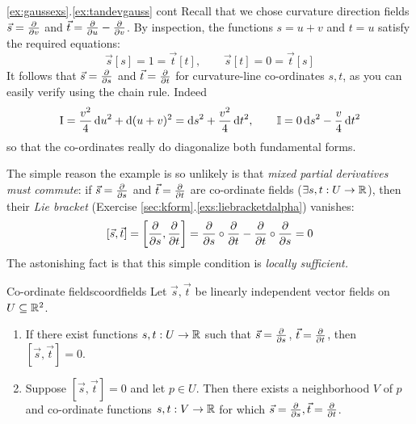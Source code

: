 \begin{example*}{\ref*{ex:gaussexs}.\ref{ex:tandevgauss} cont}{}
	Recall that we chose curvature direction fields $\vec s=\frac{\partial }{\partial v}$ and $\vec t=\frac{\partial }{\partial u}-\frac{\partial }{\partial v}$. By inspection, the functions $s=u+v$ and $t=u$ satisfy the required equations:
	\[
		\vec s[s]=1=\vec t[t],\qquad \vec s[t]=0=\vec t[s] \tag{$\ast$}
	\]
	It follows that $\vec s=\frac{\partial }{\partial s}$ and $\vec t=\frac{\partial }{\partial t}$ for curvature-line co-ordinates $s,t$, as you can easily verify using the chain rule. Indeed
	\[
		\mathrm{I}=\frac{v^2}4\,{\mathrm{d} u}^2+\mathrm{d}(u+v)^2 ={\mathrm{d} s}^2+\frac{v^2}4\,{\mathrm{d} t}^2,\qquad \mathbb{I}=0\,{\mathrm{d} s}^2-\frac v4\,{\mathrm{d} t}^2
	\]
	so that the co-ordinates really do diagonalize both fundamental forms.
\end{example*}

 The simple reason the example is so unlikely is that \emph{mixed partial derivatives must commute}: if $\vec s=\frac{\partial }{\partial s}$ and $\vec t=\frac{\partial }{\partial t}$ are co-ordinate fields ($\exists s,t:U\to\mathbb{R}$), then their \emph{Lie bracket} (Exercise \ref*{sec:kform}.\ref{exs:liebracketdalpha}) vanishes:
\[
	[\vec s,\vec t]=\left[\frac{\partial }{\partial s},\frac{\partial }{\partial t}\right]=\frac{\partial }{\partial s}\circ\frac{\partial }{\partial t}-\frac{\partial }{\partial t}\circ\frac{\partial }{\partial s}=0
\]
The astonishing fact is that this simple condition is \emph{locally sufficient.}

\begin{thm}{Co-ordinate fields}{coordfields}
	Let $\vec s,\vec t$ be linearly independent vector fields on $U\subseteq\mathbb{R}^2$.
	\begin{enumerate}
	  \item If there exist functions $s,t:U\to\mathbb{R}$ such that $\vec s=\frac{\partial }{\partial s}$, $\vec t=\frac{\partial }{\partial t}$, then $[\vec s,\vec t]=0$.
	  \item Suppose $[\vec s,\vec t]=0$ and let $p\in U$. Then there exists a neighborhood $V$ of $p$ and co-ordinate functions $s,t:V\to\mathbb{R}$ for which $\vec s=\frac{\partial }{\partial s},\vec t=\frac{\partial }{\partial t}$.
	\end{enumerate}
\end{thm}


